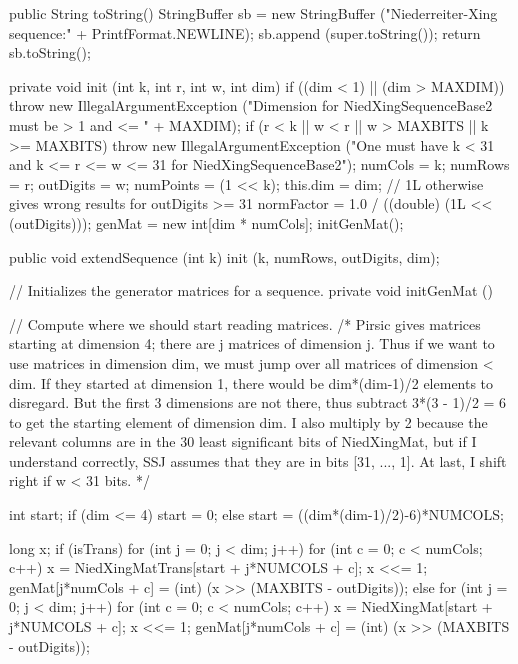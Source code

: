 \begin{code}\begin{hide}

   public String toString() {
      StringBuffer sb = new StringBuffer ("Niederreiter-Xing sequence:" +
                                           PrintfFormat.NEWLINE);
      sb.append (super.toString());
      return sb.toString();
   }

   private void init (int k, int r, int w, int dim) {
      if ((dim < 1) || (dim > MAXDIM))
         throw new IllegalArgumentException 
            ("Dimension for NiedXingSequenceBase2 must be > 1 and <= " + MAXDIM);
      if (r < k || w < r || w > MAXBITS || k >= MAXBITS) 
         throw new IllegalArgumentException
        ("One must have k < 31 and k <= r <= w <= 31 for NiedXingSequenceBase2");
      numCols   = k;
      numRows   = r;
      outDigits = w;
      numPoints = (1 << k);
      this.dim  = dim;
      // 1L otherwise gives wrong results for outDigits >= 31
      normFactor = 1.0 / ((double) (1L << (outDigits)));
      genMat = new int[dim * numCols];
      initGenMat();
   } 


   public void extendSequence (int k) {
      init (k, numRows, outDigits, dim);
   }


   // Initializes the generator matrices for a sequence.
   private void initGenMat ()  {
      // Compute where we should start reading matrices.
      /* Pirsic gives matrices starting at dimension 4; there are j matrices
         of dimension j. Thus if we want to use matrices in dimension
         dim, we must jump over all matrices of dimension < dim. If they
         started at dimension 1, there would be dim*(dim-1)/2 elements to
         disregard. But the first 3 dimensions are not there, thus subtract
         3*(3 - 1)/2 = 6 to get the starting element of dimension dim.
      I also multiply by 2 because the relevant columns are in the 30 least 
         significant bits of NiedXingMat, but if I understand correctly,
         SSJ assumes that they are in bits [31, ..., 1].
      At last, I shift right if w < 31 bits. */

      int start;
      if (dim <= 4) 
         start = 0;
      else
         start = ((dim*(dim-1)/2)-6)*NUMCOLS;

      long x;
      if (isTrans) {
         for (int j = 0; j < dim; j++)
            for (int c = 0; c < numCols; c++) {
               x = NiedXingMatTrans[start + j*NUMCOLS + c];
               x <<= 1;
               genMat[j*numCols + c] = (int) (x >> (MAXBITS - outDigits));
             }
      } else {
         for (int j = 0; j < dim; j++)
            for (int c = 0; c < numCols; c++) {
               x = NiedXingMat[start + j*NUMCOLS + c];
               x <<= 1;
               genMat[j*numCols + c] = (int) (x >> (MAXBITS - outDigits));
            }
      }
   }



\end{hide}
\end{code}
